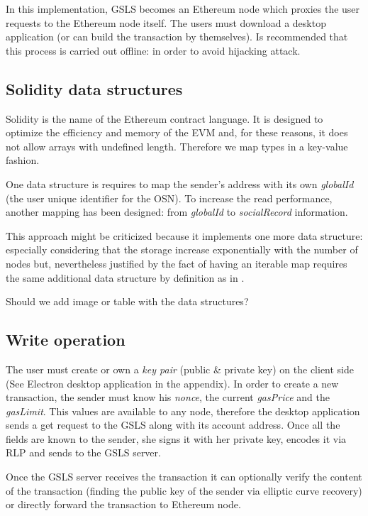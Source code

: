 In this implementation, GSLS becomes an Ethereum node which proxies the user requests to the Ethereum node itself.
The users must download a desktop application (or can build the transaction by themselves). Is recommended that this process is carried out offline: in order to avoid hijacking attack.

\subsection{Solidity data structures}
Solidity is the name of the Ethereum contract language. It is designed to optimize the efficiency and memory of the EVM and, for these reasons, it does not allow arrays with undefined length.
Therefore we map types in a key-value fashion.

One data structure is requires to map the sender's address with its own \textit{globalId} (the user unique identifier for the OSN).  To increase the read performance, another mapping has been designed: from \textit{globalId} to \textit{socialRecord} information.

This approach might be criticized because it implements one more data structure: especially considering that the storage increase exponentially with the number of nodes but, nevertheless justified by the fact of having an iterable map requires the same additional data structure by definition as in \cite{datastructure_solidity}.

\begin{notation}
  Should we add image or table with the data structures?
\end{notation}


\subsection{Write operation}
The user must create or own a \textit{key pair} (public \& private key) on the client side (See Electron desktop application in the appendix).
In order to create a new transaction, the sender must know his \textit{nonce}, the current \textit{gasPrice} and the \textit{gasLimit}. This values are available to any node, therefore the desktop application sends a get request to the GSLS along with its account address. Once all the fields are known to the sender, she signs it with her private key, encodes it via RLP and sends to the GSLS server.

Once the GSLS server receives the transaction it can optionally verify the content of the transaction (finding the public key of the sender via elliptic curve recovery) or directly forward the transaction to Ethereum node.

